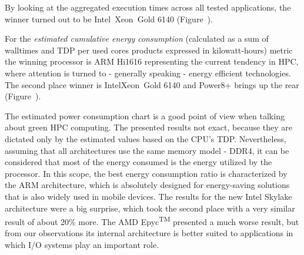 By looking at the aggregated execution times across all tested applications, the winner turned out to be Intel\textregistered\ Xeon\textregistered\ Gold 6140 (Figure~).



For the \textit{estimated cumulative energy consumption} (calculated as a sum of walltimes and TDP per used cores products expressed in kilowatt-hours) metric the winning processor is ARM Hi1616 representing the current tendency in HPC, where attention is turned to - generally speaking - energy efficient technologies. The second place winner is Intel\textregistered Xeon\textregistered\ Gold 6140 and Power8+ brings up the rear (Figure~). 

The estimated power consumption chart is a good point of view when talking about green HPC computing. The presented results not exact, because they are dictated only by the estimated values based on the CPU's TDP. Nevertheless, assuming that all architectures use the same memory model - DDR4, it can be considered that most of the energy consumed is the energy utilized by the processor. In this scope, the best energy consumption ratio is characterized by the ARM architecture, which is absolutely designed for energy-saving solutions that is also widely used in mobile devices. The results for the new Intel Skylake architecture were a big surprise, which took the second place with a very similar result of about 20\% more. The AMD Epyc\textsuperscript{TM} presented a much worse result, but from our observations its internal architecture is better suited to applications in which I/O systems play an important role.

